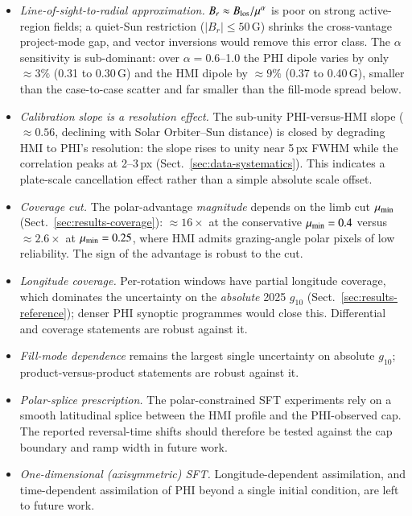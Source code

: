 \documentclass{aa}
\begin{document}
\begin{itemize}
    \item \emph{Line-of-sight-to-radial approximation.} $B_r \approx B_{\rm los}/\mu^{\alpha}$ is poor on strong active-region fields; a quiet-Sun restriction ($|B_r| \le 50$\,G) shrinks the cross-vantage project-mode gap, and vector inversions would remove this error class. The $\alpha$ sensitivity is sub-dominant: over $\alpha = 0.6$--1.0 the PHI dipole varies by only $\approx 3\%$ (0.31 to 0.30\,G) and the HMI dipole by $\approx 9\%$ (0.37 to 0.40\,G), smaller than the case-to-case scatter and far smaller than the fill-mode spread below.
    \item \emph{Calibration slope is a resolution effect.} The sub-unity PHI-versus-HMI slope ($\approx 0.56$, declining with Solar Orbiter--Sun distance) is closed by degrading HMI to PHI's resolution: the slope rises to unity near 5\,px FWHM while the correlation peaks at 2--3\,px (Sect.~\ref{sec:data-systematics}). This indicates a plate-scale cancellation effect rather than a simple absolute scale offset.
    \item \emph{Coverage cut.} The polar-advantage \emph{magnitude} depends on the limb cut $\mu_{\rm min}$ (Sect.~\ref{sec:results-coverage}): $\approx 16\times$ at the conservative $\mu_{\rm min} = 0.4$ versus $\approx 2.6\times$ at $\mu_{\rm min} = 0.25$, where HMI admits grazing-angle polar pixels of low reliability. The sign of the advantage is robust to the cut.
    \item \emph{Longitude coverage.} Per-rotation windows have partial longitude coverage, which dominates the uncertainty on the \emph{absolute} 2025 $g_{10}$ (Sect.~\ref{sec:results-reference}); denser PHI synoptic programmes would close this. Differential and coverage statements are robust against it.
    \item \emph{Fill-mode dependence} remains the largest single uncertainty on absolute $g_{10}$; product-versus-product statements are robust against it.
    \item \emph{Polar-splice prescription.} The polar-constrained SFT experiments rely on a smooth latitudinal splice between the HMI profile and the PHI-observed cap. The reported reversal-time shifts should therefore be tested against the cap boundary and ramp width in future work.
    \item \emph{One-dimensional (axisymmetric) SFT.} Longitude-dependent assimilation, and time-dependent assimilation of PHI beyond a single initial condition, are left to future work.
\end{itemize}
\end{document}
